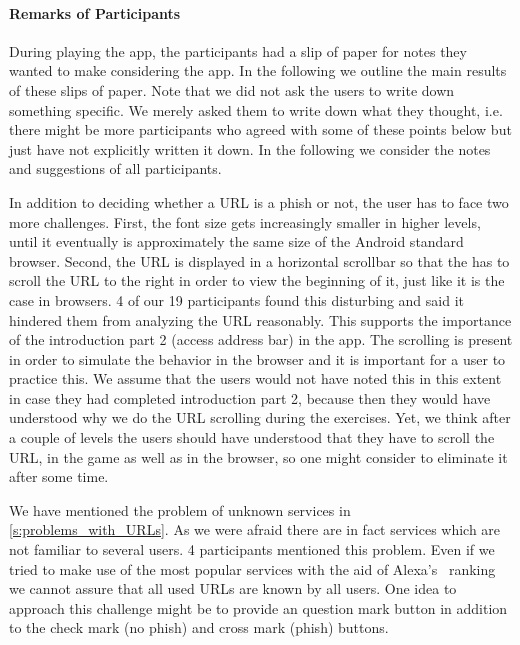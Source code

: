 \paragraph{Remarks of Participants}
During playing the app, the participants had a slip of paper for notes they wanted to make considering the app.
In the following we outline the main results of these slips of paper.
Note that we did not ask the users to write down something specific. 
We merely asked them to write down what they thought, i.e. there might be more participants who agreed with some of these points below but just have not explicitly written it down.
In the following we consider the notes and suggestions of all participants. 
\begin{description}[leftmargin=0cm]	
	\item[Scrolling of URL:] In addition to deciding whether a URL is a phish or not, the user has to face two more challenges. 
First, the font size gets increasingly smaller in higher levels, until it eventually is approximately the same size of the Android standard browser.
Second, the URL is displayed in a horizontal scrollbar so that the has to scroll the URL to the right in order to view the beginning of it, just like it is the case in browsers.
4 of our 19 participants found this disturbing and said it hindered them from analyzing the URL reasonably. 
This supports the importance of the introduction part 2 (access address bar) in the app.
The scrolling is present in order to simulate the behavior in the browser and it is important for a user to practice this.
We assume that the users would not have noted this in this extent in case they had completed introduction part 2, because then they would have understood why we do the URL scrolling during the exercises.
Yet, we think after a couple of levels the users should have understood that they have to scroll the URL, in the game as well as in the browser, so one might consider to eliminate it after some time. 
	\item[Unknown Services:] We have mentioned the problem of unknown services in \autoref{s:problems_with_URLs}.
As we were afraid there are in fact services which are not familiar to several users.
4 participants mentioned this problem.
Even if we tried to make use of the most popular services with the aid of Alexa's~\cite{alexa} ranking we cannot assure that all used URLs are known by all users.
One idea to approach this challenge might be to provide an question mark button in addition to the check mark (no phish) and cross mark (phish) buttons. 

\end{description}
